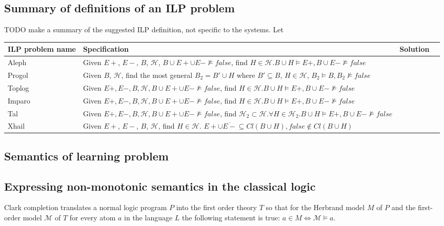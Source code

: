 \subsection{Summary of definitions of an ILP problem}
TODO make a summary of the suggested ILP definition, not specific to the systems.
Let 
\begin{center}
    \begin{tabular}{ | l | p{15cm} | l | p{5cm} |}
    \hline
	ILP problem name & Specification & Solution\\ \hline
    Aleph & Given $E+$, $E-$, $B$, $\mathcal{H}$, $B \cup E+ \cup E- \not\models false$, find $H \in \mathcal{H}. B \cup H \models E+, B \cup E- \not\models false$\\ \hline
    Progol & Given $B$, $\mathcal{H}$, find the most general $B_2 = B' \cup H$ where $B' \subseteq B$, $H \in \mathcal{H}$, $B_2 \models B, B_2 \not\models false$\\ \hline
    Toplog & Given $E+, E-, B, \mathcal{H}, B \cup E+ \cup E- \not\models false$, find $H \in \mathcal{H}. B \cup H \models E+, B \cup E- \not\models false$ \\ \hline
    Imparo & Given $E+, E-, B, \mathcal{H}, B \cup E+ \cup E- \not\models false$, find $H \in \mathcal{H}. B \cup H \models E+, B \cup E- \not\models false$ \\ \hline
    Tal & Given $E+, E-, B, \mathcal{H}, B \cup E+ \cup E- \not\models false$, find $\mathcal{H}_2 \subset \mathcal{H}. \forall H \in \mathcal{H}_2. B \cup H \models E+, B \cup E- \not\models false$ \\ \hline
    Xhail & Given $E+$, $E-$, $B$, $\mathcal{H}$, find $H \in \mathcal{H}$. $E+ \cup \overline{E-} \subseteq Cl(B \cup H), false \not\in Cl(B \cup H)$\\ \hline
    \hline
    \end{tabular}
\end{center}




\subsection{Semantics of learning problem}
\subsection{Expressing non-monotonic semantics in the classical logic}
Clark completion translates a normal logic program $P$ into the first order theory $T$ so that for the Herbrand model $M$ of $P$ and the first-order model $\mathcal{M}$ of $T$ for every atom $a$ in the language $L$ the following statement is true:
$a \in M \iff \mathcal{M} \models a$.
